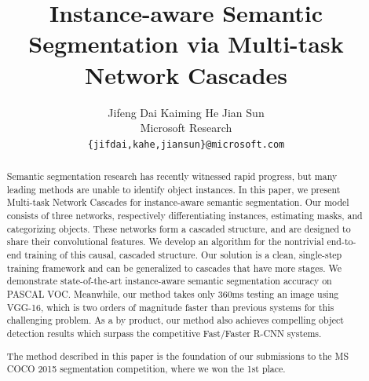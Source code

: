 \documentclass[10pt,twocolumn,letterpaper]{article}
\begin{document}
\title{Instance-aware Semantic Segmentation via Multi-task Network Cascades}

\author{Jifeng Dai \qquad\qquad Kaiming He \qquad\qquad Jian Sun \vspace{8pt}\\
Microsoft Research\\
{\tt\small \{jifdai,kahe,jiansun\}@microsoft.com}
}


\maketitle

\begin{abstract}
\vspace{-1em}
Semantic segmentation research has recently witnessed rapid progress, but many leading methods are unable to identify object instances. In this paper, we present Multi-task Network Cascades for instance-aware semantic segmentation. Our model consists of three networks, respectively differentiating instances, estimating masks, and categorizing objects. These networks form a cascaded structure, and are designed to share their convolutional features. We develop an algorithm for the nontrivial end-to-end training of this causal, cascaded structure. Our solution is a clean, single-step training framework and can be generalized to cascades that have more stages.
We demonstrate state-of-the-art instance-aware semantic segmentation accuracy on PASCAL VOC. Meanwhile, our method takes only 360ms testing an image using VGG-16, which is two orders of magnitude faster than previous systems for this challenging problem. As a by product, our method also achieves compelling object detection results which surpass the competitive Fast/Faster R-CNN systems.

The method described in this paper is the foundation of our submissions to the MS COCO 2015 segmentation competition, where we won the 1st place.
\end{abstract}


\end{document}
